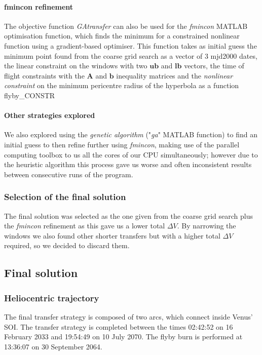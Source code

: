 \documentclass[11pt,a4paper]{report}
\renewcommand{\vec}[1]{\mathbf{#1}}
\begin{document}
\paragraph{fmincon refinement}
The objective function \textit{GAtransfer} can also be used for the \textit{fmincon} MATLAB optimisation function, which finds the minimum for a constrained nonlinear function using a gradient-based optimiser. This function takes as initial guess the minimum point found from the coarse grid search as a vector of 3 mjd2000 dates, the linear constraint on the windows with two $\vec{ub}$ and $\vec{lb}$ vectors, the time of flight constraints with the $\vec{A}$ and $\vec{b}$ inequality matrices and the \emph{nonlinear constraint} on the minimum pericentre radius of the hyperbola as a function flyby\_CONSTR\\
\paragraph{Other strategies explored}

We also explored using the \emph{genetic algorithm} ("\textit{ga}" MATLAB function) to find an initial guess to then refine further using \textit{fmincon}, making use of the parallel computing toolbox to us all the cores of our CPU simultaneously; however due to the heuristic algorithm this process gave us worse and often inconsistent results between consecutive runs of the program.

\subsubsection{Selection of the final solution}
The final solution was selected as the one given from the coarse grid search plus the \textit{fmincon} refinement as this gave us a lower total $\Delta V$. By narrowing the windows we also found other shorter transfers but with a higher total $\Delta V$ required, so we decided to discard them.

\subsection{Final solution}

\subsubsection{Heliocentric trajectory}
The final transfer strategy is composed of two arcs, which connect inside Venus’ SOI.
The transfer strategy is completed between the times 02:42:52 on  16 February 2033 and 19:54:49 on 10 July 2070. The flyby burn is performed at 13:36:07 on 30 September 2064.\\
\end{document}
